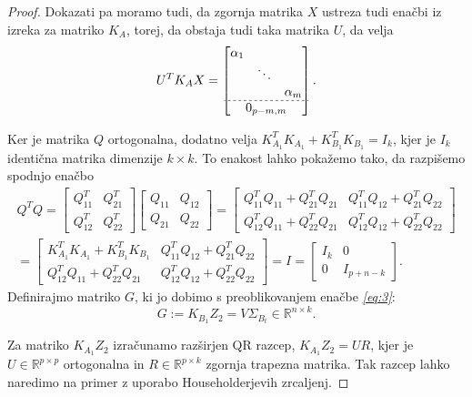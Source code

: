 \documentclass[mat1]{article}
\theoremstyle{definition}
\begin{document}
\begin{proof}
Dokazati pa moramo tudi, da zgornja matrika $X$ ustreza tudi enačbi iz izreka za matriko $K_A$, torej, da obstaja tudi taka matrika $U$, da velja
\begin{gather*}
 U^T K_A X = 
\begin{bmatrix}
\begin{matrix}
\alpha_1 & & \\
 & \ddots & \\
 & & \alpha_m
\end{matrix} \\ \hdashline[2pt/2pt]
0_{p-m, m}
\end{bmatrix}
\text{.} 
\end{gather*}

Ker je matrika $Q$ ortogonalna, dodatno velja $K_{A_1}^TK_{A_1} + K_{B_1}^TK_{B_1} = I_k$, kjer je $I_k$ identična matrika dimenzije $k \times k$. To enakost lahko pokažemo tako, da razpišemo spodnjo enačbo
\begin{gather*}
Q^T Q = 
\begin{bmatrix}
Q_{11}^T & Q_{21}^T \\ 
Q_{12}^T & Q_{22}^T
\end{bmatrix}
\begin{bmatrix}
Q_{11} & Q_{12} \\ 
Q_{21} & Q_{22}
\end{bmatrix} =
\begin{bmatrix}
Q_{11}^T Q_{11} + Q_{21}^T Q_{21} & Q_{11}^T Q_{12} + Q_{21}^T Q_{22} \\ 
Q_{12}^T Q_{11} + Q_{22}^T Q_{21} & Q_{12}^T Q_{12} + Q_{22}^T Q_{22}
\end{bmatrix} \\ =
\begin{bmatrix}
K_{A_1}^TK_{A_1} + K_{B_1}^TK_{B_1} & Q_{11}^T Q_{12} + Q_{21}^T Q_{22} \\ 
Q_{12}^T Q_{11} + Q_{22}^T Q_{21} & Q_{12}^T Q_{12} + Q_{22}^T Q_{22}
\end{bmatrix}  = I =
\begin{bmatrix}
I_k & 0\\ 
0 & I_{p+n-k}
\end{bmatrix} \text{.}
\end{gather*}
Definirajmo matriko $G$, ki jo dobimo s preoblikovanjem enačbe \textit{\eqref{eq:3}}:
$$ G := K_{B_1} Z_2 = V \Sigma_{B_t} \in \mathbb{R}^{n \times k} \text{.}
$$

Za matriko $K_{A_1} Z_2$ izračunamo razširjen QR razcep, $ K_{A_1} Z_2 = U R$, kjer je $U \in \mathbb{R}^{p \times p}$ ortogonalna in $R \in \mathbb{R}^{p \times k}$ zgornja trapezna matrika. Tak razcep lahko naredimo na primer z uporabo Householderjevih zrcaljenj.


\end{proof}
\end{document}

